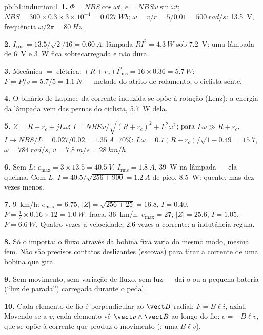 \begin{solution}{pb:b1:induction:1}
\textbf{1.} $\Phi = NBS\cos\omega t$, $e = NBS\omega\sin\omega t$; $NBS = 300 \times
0.3 \times 3 \times 10^{-4} = \qty{0.027}{Wb}$; $\omega = v/r = 5/0.01 = \qty{500}{rad/s}$:
 \qty{13.5}{V}, frequência $\omega/2\pi = \qty{80}{Hz}$.

\textbf{2.} $I_{\text{rms}} = 13.5/\sqrt2/16 = \qty{0.60}{A}$; lâmpada $RI^2 = \qty{4.3}{W}$
sob \qty{7.2}{V}: uma lâmpada de \qty{6}{V} e \qty{3}{W} fica sobrecarregada e não
dura.

\textbf{3.} Mecânica $=$ elétrica: $(R + r_c)I_{\text{rms}}^2 = 16 \times 0.36 =
\qty{5.7}{W}$; $F = P/v = 5.7/5 = \qty{1.1}{N}$ --- metade do atrito de rolamento;
o ciclista sente.

\textbf{4.} O binário de Laplace da corrente induzida se opõe à rotação
(Lenz); a energia da lâmpada vem das pernas do ciclista, \qty{5.7}{W} dela.

\textbf{5.} $\underline Z = R + r_c + jL\omega$; $I = NBS\omega/\sqrt{(R + r_c)^2 + L^2\omega^2}$;
para $L\omega \gg R + r_c$, $I \to NBS/L = 0.027/0.02 = \qty{1.35}{A}$. $70\%$: $L\omega
= 0.7(R + r_c)/\sqrt{1 - 0.49} = 15.7$, $\omega = \qty{784}{rad/s}$, $v = \qty{7.8}{m/s}
= \qty{28}{km/h}$.

\textbf{6.} Sem $L$: $e_{\max} = 3 \times 13.5 = \qty{40.5}{V}$, $I_{\text{rms}} =
\qty{1.8}{A}$, \qty{39}{W} na lâmpada --- ela queima. Com $L$: $I = 40.5/\sqrt{256 +
900} = \qty{1.2}{A}$ de pico, \qty{8.5}{W}: quente, mas dez vezes menos.

\textbf{7.} \qty{9}{km/h}: $e_{\max} = 6.75$, $|Z| = \sqrt{256 + 25} = 16.8$, $I = 0.40$,
$P = \tfrac12 \times 0.16 \times 12 = \qty{1.0}{W}$: fraca. \qty{36}{km/h}: $e_{\max} = 27$,
$|Z| = 25.6$, $I = 1.05$, $P = \qty{6.6}{W}$. Quatro vezes a velocidade, $2.6$ vezes
a corrente: a indutância regula.

\textbf{8.} Só o  importa: o fluxo através da bobina fixa
varia do mesmo modo, mesma fem. Não são precisos contatos deslizantes
(escovas) para tirar a corrente de uma bobina que gira.

\textbf{9.} Sem movimento, sem variação de fluxo, sem luz --- daí o  ou
a pequena bateria (``luz de parada'') carregada durante o pedal.

\textbf{10.} Cada elemento de fio é perpendicular ao $\vect B$ radial:
$F = B\ell i$, axial. Movendo-se a $v$, cada elemento vê $\vect v\wedge\vect B$
ao longo do fio: $e = -B\ell v$, que se opõe à corrente que produz o
movimento (: uma  $B\ell v$).


\end{solution}

